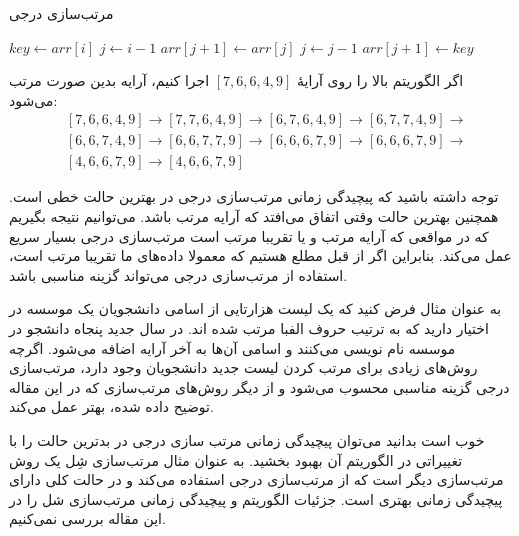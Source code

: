 \documentclass[12pt]{article}
\begin{document}
\begin{algorithm}[H]
  \caption{مرتب‌سازی درجی}
  \begin{latin}
    \begin{algorithmic}[1]
      \State $key \gets arr[i]$
      \State $j \gets i-1$
      \State $arr[j+1] \gets arr[j]$
      \State $j \gets j - 1$
      \EndWhile
      \State $arr[j+1] \gets key$
      \EndFor
      \EndProcedure
    \end{algorithmic}
  \end{latin}
  \label{alg:a1}
\end{algorithm}

اگر الگوریتم بالا را روی آرایهٔ
$[7, 6, 6, 4, 9]$
اجرا کنیم،
آرایه بدین صورت مرتب می‌شود:
\begin{align*}
   & [7, 6, 6, 4, 9] \rightarrow [7, 7, 6, 4, 9] \rightarrow
  [6, 7, 6, 4, 9] \rightarrow [6, 7, 7, 4, 9] \rightarrow    \\
   & [6, 6, 7, 4, 9] \rightarrow [6, 6, 7, 7, 9] \rightarrow
  [6, 6, 6, 7, 9] \rightarrow [6, 6, 6, 7, 9]  \rightarrow   \\
   & [4, 6, 6, 7, 9] \rightarrow [4, 6, 6, 7, 9]
\end{align*}

توجه داشته باشید که پیچیدگی زمانی مرتب‌سازی درجی در بهترین حالت خطی است.
همچنین بهترین حالت وقتی اتفاق می‌افتد که آرایه مرتب باشد.
می‌توانیم نتیجه بگیریم که در مواقعی که آرایه مرتب و یا تقریبا مرتب است
مرتب‌سازی درجی بسیار سریع عمل می‌کند.
بنابراین اگر از قبل مطلع هستیم که معمولا داده‌های ما تقریبا مرتب است، استفاده از مرتب‌سازی درجی
می‌تواند گزینه مناسبی باشد.

به عنوان مثال فرض کنید که یک لیست هزارتایی از اسامی دانشجویان یک موسسه در اختیار دارید که به ترتیب حروف الفبا مرتب شده اند.
در سال جدید پنجاه دانشجو در موسسه نام نویسی می‌کنند و اسامی آن‌ها به آخر آرایه اضافه می‌شود.
اگرچه روش‌های زیادی برای مرتب کردن لیست جدید دانشجویان وجود دارد، مرتب‌سازی درجی گزینه مناسبی محسوب می‌شود
و از دیگر روش‌های مرتب‌سازی که در این مقاله توضیح داده شده، بهتر عمل می‌کند.

خوب است بدانید
می‌توان پیچیدگی زمانی مرتب سازی درجی در بدترین حالت را با تغییراتی در الگوریتم آن بهبود بخشید.
به عنوان مثال مرتب‌سازی شِل
یک روش مرتب‌سازی دیگر است که از مرتب‌سازی درجی استفاده می‌کند
و در حالت کلی دارای پیچیدگی زمانی بهتری است.
\cite{shell1}
\cite{shell2}
جزئیات الگوریتم و پیچیدگی زمانی مرتب‌سازی شل را در این مقاله بررسی نمی‌کنیم.

{
\fontsize{12pt}{10pt}\selectfont


}
\end{document}
